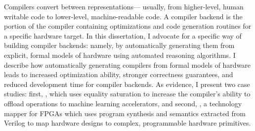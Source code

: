 Compilers convert
  between representations---%
  usually, from 
  higher-level, human writable code
  to lower-level,
  machine-readable code.
A compiler backend is
  the portion of the 
  compiler containing
  optimizations
  and code generation routines
  for a specific hardware target.
%
In this dissertation,
  I advocate for a specific way of
  building compiler backends:
  namely, by automatically generating them
  from explicit, formal models of hardware
  using automated reasoning algorithms.
I describe how automatically generating compilers
  from formal models of hardware
  leads to increased optimization ability,
  stronger correctness guarantees,
  and reduced development time
  for compiler backends.
%
As evidence, I present two
  case studies:
  first, \g,
  which uses
  equality saturation
  to increase the \TLA compiler's
  ability to offload operations
  to machine learning accelerators,
  and second,
  \lr,
  a technology mapper for FPGAs
  which uses program synthesis
  and semantics extracted from Verilog
  to map hardware designs
  to complex, programmable hardware primitives.
